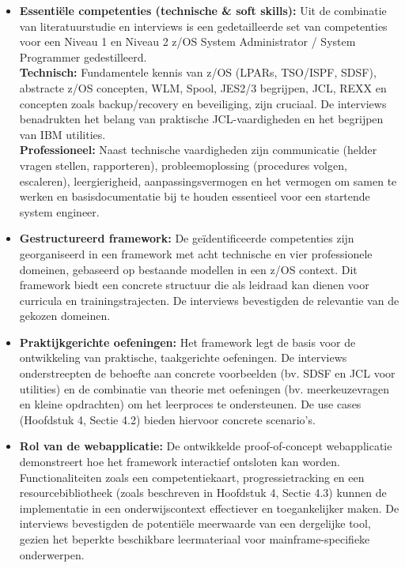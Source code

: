 \begin{itemize}
	
	\item \textbf{Essentiële competenties (technische \& soft skills):} 
	Uit de combinatie van literatuurstudie en interviews is een gedetailleerde set van competenties voor een Niveau 1 en Niveau 2 z/OS System Administrator / System Programmer gedestilleerd.\\
	
	\textbf{Technisch:} Fundamentele kennis van z/OS (LPARs, TSO/ISPF, SDSF), abstracte z/OS concepten, WLM, Spool, JES2/3 begrijpen, JCL, REXX en concepten zoals backup/recovery en beveiliging, zijn cruciaal. De interviews benadrukten het belang van praktische JCL-vaardigheden en het begrijpen van IBM utilities.\\
	
	\textbf{Professioneel:} Naast technische vaardigheden zijn communicatie (helder vragen stellen, rapporteren), probleemoplossing (procedures volgen, escaleren), leergierigheid, aanpassingsvermogen en het vermogen om samen te werken en basisdocumentatie bij te houden essentieel voor een startende system engineer.
	
	\item \textbf{Gestructureerd framework:} 
	De geïdentificeerde competenties zijn georganiseerd in een framework met acht technische en vier professionele domeinen, gebaseerd op bestaande modellen in een z/OS context. Dit framework biedt een concrete structuur die als leidraad kan dienen voor curricula en trainingstrajecten. De interviews bevestigden de relevantie van de gekozen domeinen.
	
	\item \textbf{Praktijkgerichte oefeningen:} 
	Het framework legt de basis voor de ontwikkeling van praktische, taakgerichte oefeningen. De interviews onderstreepten de behoefte aan concrete voorbeelden (bv. SDSF en JCL voor utilities) en de combinatie van theorie met oefeningen (bv. meerkeuzevragen en kleine opdrachten) om het leerproces te ondersteunen. De use cases (Hoofdstuk 4, Sectie 4.2) bieden hiervoor concrete scenario’s.
	
	\item \textbf{Rol van de webapplicatie:} 
	De ontwikkelde proof-of-concept webapplicatie demonstreert hoe het framework interactief ontsloten kan worden. Functionaliteiten zoals een competentiekaart, progressietracking en een resourcebibliotheek (zoals beschreven in Hoofdstuk 4, Sectie 4.3) kunnen de implementatie in een onderwijscontext effectiever en toegankelijker maken. De interviews bevestigden de potentiële meerwaarde van een dergelijke tool, gezien het beperkte beschikbare leermateriaal voor mainframe-specifieke onderwerpen.
	
\end{itemize}

